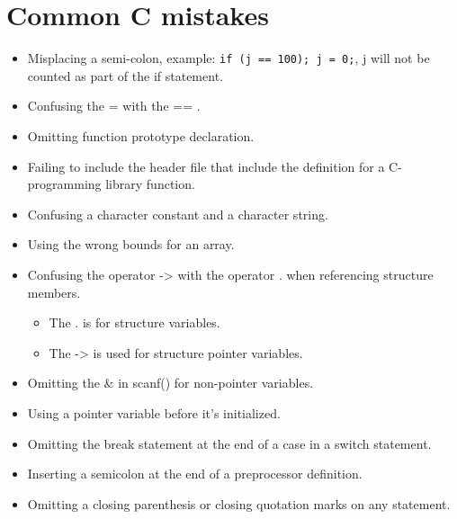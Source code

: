 \section{Common C mistakes}
\begin{itemize}
    \item Misplacing a semi-colon, example: \texttt{if (j == 100); j = 0;}, j will not be counted as part of the if statement. 
    \item Confusing the = with the == .
    \item Omitting function prototype declaration.
    \item Failing to include the header file that include the definition for a C-programming library function.
    \item Confusing a character constant and a character string. 
    \item Using the wrong bounds for an array. 
    \item Confusing the operator -> with the operator . when referencing structure members.
        \begin{itemize}
            \item The . is for structure variables.
            \item The -> is used for structure pointer variables.
        \end{itemize}
    \item Omitting the \& in scanf() for non-pointer variables.
    \item Using a pointer variable before it's initialized. 
    \item Omitting the break statement at the end of a case in a switch statement. 
    \item Inserting a semicolon at the end of a preprocessor definition.
    \item Omitting a closing parenthesis or closing quotation marks on any statement.
\end{itemize}


